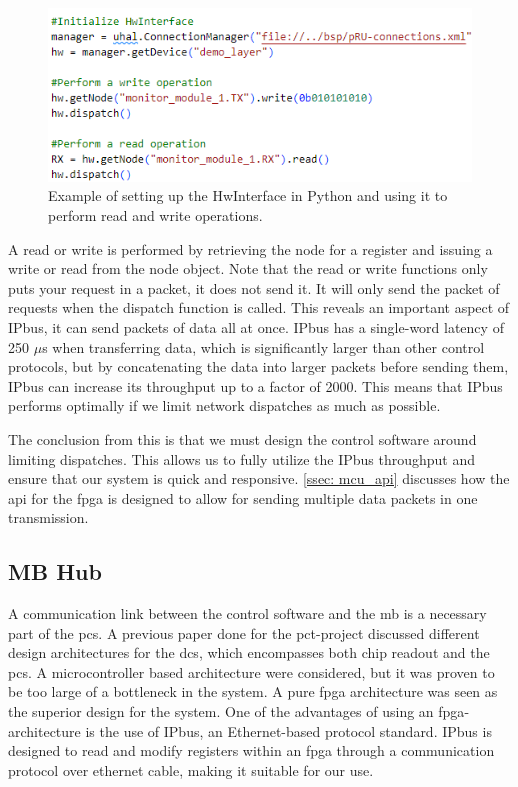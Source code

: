 \documentclass[main.tex]{subfiles}
\begin{document}
\begin{figure}[!htpb]
    \centering
    \includegraphics[scale=0.8]{images/HwInterface_example.png}
    \caption{Example of setting up the HwInterface in Python and using it to perform read and write operations.}
    \label{fig: hw_example}
\end{figure}
\FloatBarrier

A read or write is performed by retrieving the node for a register and issuing a write or read from the node object. Note that the read or write functions only puts your request in a packet, it does not send it. It will only send the packet of requests when the dispatch function is called. This reveals an important aspect of IPbus, it can send packets of data all at once. IPbus has a single-word latency of 250 $\mu$s when transferring data, which is significantly larger than other control protocols, but by concatenating the data into larger packets before sending them, IPbus can increase its throughput up to a factor of 2000\cite{IPbus}. This means that IPbus performs optimally if we limit network dispatches as much as possible.

The conclusion from this is that we must design the control software around limiting dispatches. This allows us to fully utilize the IPbus throughput and ensure that our system is quick and responsive. \autoref{ssec: mcu_api} discusses how the \gls{api} for the \gls{fpga} is designed to allow for sending multiple data packets in one transmission.


\subsection{MB Hub}
\label{section: fpga_design}
A communication link between the control software and the \gls{mb} is a necessary part of the \gls{pcs}. A previous paper done for the \gls{pct}-project discussed different design architectures for the \gls{dcs}, which encompasses both chip readout and the \gls{pcs}\cite{ola}. A microcontroller based architecture were considered, but it was proven to be too large of a bottleneck in the system. A pure \gls{fpga} architecture was seen as the superior design for the system. One of the advantages of using an \gls{fpga}-architecture is the use of IPbus, an Ethernet-based protocol standard. IPbus is designed to read and modify registers within an \gls{fpga} through a communication protocol over ethernet cable, making it suitable for our use.
\end{document}
